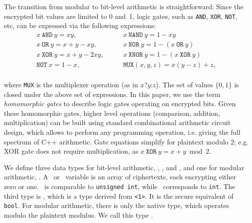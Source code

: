 The transition from modular to bit-level arithmetic is straightforward: Since
the encrypted bit values are limited to 0 and~1, logic gates, such as \texttt{AND}, \texttt{XOR}, \texttt{NOT}, etc, can be expressed via the following expressions:
\vspace{-0.2cm}
\begin{equation*}\label{eq:logic}
\begin{split}
x \ \texttt{AND} \ y = xy,& \qquad x \ \texttt{NAND} \ y = 1-xy \\
x \ \texttt{OR} \ y = x+y-xy,& \qquad x \ \texttt{NOR} \ y = 1-(x \ \texttt{OR} \ y) \\
x \ \texttt{XOR} \ y = x+y-2xy,& \qquad x \ \texttt{XNOR} \ y = 1-(x \ \texttt{XOR} \ y) \\
 \texttt{NOT} \ x = 1-x,& \qquad \texttt{MUX}(x,y,z) = x(y-z)+z, \\
\end{split}
\end{equation*}

\noindent where \texttt{MUX} is the multiplexer operation (as in {$x$?$y$:$z$}). The set of values $\{0,1\}$ is closed under the above set of expressions. 
In this paper, we use the term \emph{homomorphic gates} to describe logic gates operating on encrypted bits. Given these homomorphic gates, higher level operations (comparison, addition, multiplication) can be built using standard combinational arithmetic circuit design, which allows to perform any programming operation, i.e. giving the full spectrum of C++ arithmetic. Gate equations simplify for plaintext modulo $2$; e.g. XOR gate does not require multiplication, as \mbox{$x \ \texttt{XOR} \ y = x+y \bmod 2$}.

We define three data types for bit-level arithmetic, \secuint, \secint, and \secbool, and one for modular arithmetic, \secmod. 
A \secuint\ or \secint\ variable is an array of ciphertexts, each encrypting either zero or one. \secuint\ is comparable to \texttt{unsigned int}, while \secint\ corresponds to \texttt{int}.
The third type is \secbool, which is a type derived from \secuint\texttt{<1>}. It is the secure equivalent of \texttt{bool}.
For modular arithmetic, there is only the native type, which operates modulo the plaintext modulus. We call this type \secmod.

